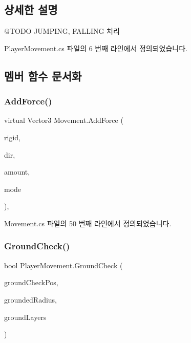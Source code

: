 \subsection{상세한 설명}
@\+T\+O\+DO J\+U\+M\+P\+I\+NG, F\+A\+L\+L\+I\+NG 처리 

Player\+Movement.\+cs 파일의 6 번째 라인에서 정의되었습니다.



\subsection{멤버 함수 문서화}
\mbox{\label{class_movement_ab0b20a2f058e2eed15f4bdf0503a2566}} 
\subsubsection{\texorpdfstring{AddForce()}{AddForce()}}
{\footnotesize\ttfamily virtual Vector3 Movement.\+Add\+Force (\begin{DoxyParamCaption}\item[{Rigidbody2D}]{rigid,  }\item[{Vector3}]{dir,  }\item[{float}]{amount,  }\item[{Force\+Mode2D}]{mode }\end{DoxyParamCaption})\hspace{0.3cm}{\ttfamily [virtual]}, {\ttfamily [inherited]}}



Movement.\+cs 파일의 50 번째 라인에서 정의되었습니다.


\begin{DoxyCode}{0}

\end{DoxyCode}
\mbox{\label{class_player_movement_a957f2e09268831052dbd00a9e8e4fa70}} 
\subsubsection{\texorpdfstring{GroundCheck()}{GroundCheck()}}
{\footnotesize\ttfamily bool Player\+Movement.\+Ground\+Check (\begin{DoxyParamCaption}\item[{Vector2}]{ground\+Check\+Pos,  }\item[{float}]{grounded\+Radius,  }\item[{Layer\+Mask}]{ground\+Layers }\end{DoxyParamCaption})}



